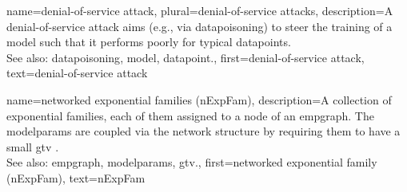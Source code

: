 	
{name={denial-of-service attack}, plural={denial-of-service attacks},
	description={A 
		denial-of-service attack aims (e.g., via \gls{datapoisoning}) to steer the training of a \gls{model} 
		such that it performs poorly for typical \glspl{datapoint}.
				\\
		See also: \gls{datapoisoning}, \gls{model}, \gls{datapoint}.},
	first={denial-of-service attack},
	text={denial-of-service attack} 
}

{name={networked exponential families (nExpFam)}, 
	description={A collection of exponential 
		families, each of them assigned to a node of an \gls{empgraph}. The \gls{modelparams} are coupled 
	   	via the network structure by requiring them to have a small \gls{gtv} \cite{JungNetExp2020}.
	   		\\
		See also: \gls{empgraph}, \gls{modelparams}, \gls{gtv}.},
	first={networked exponential family (nExpFam)},
	text={nExpFam} 
}
	 

